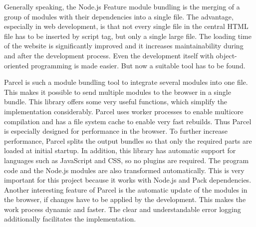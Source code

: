 Generally speaking, the Node.js Feature module bundling is the merging of a group of modules with their dependencies into a single file. The advantage, especially in web development, is that not every single file in the central HTML file has to be inserted by script tag, but only a single large file. The loading time of the website is significantly improved and it increases maintainability during and after the development process. Even the development itself with object-oriented programming is made easier. But now a suitable tool has to be found. \cite{Kasireddy2016}

Parcel is such a module bundling tool to integrate several modules into one file. This makes it possible to send multiple modules to the browser in a single bundle. This library offers some very useful functions, which simplify the implementation considerably. Parcel uses worker processes to enable multicore compilation and has a file system cache to enable very fast rebuilds. Thus Parcel is especially designed for performance in the browser. To further increase performance, Parcel splits the output bundles so that only the required parts are loaded at initial startup. In addition, this library has automatic support for languages such as JavaScript and CSS, so no plugins are required. The program code and the Node.js modules are also transformed automatically. This is very important for this project because it works with Node.js and Pack dependencies. Another interesting feature of Parcel is the automatic update of the modules in the browser, if changes have to be applied by the development. This makes the work process dynamic and faster. The clear and understandable error logging additionally facilitates the implementation. \cite{Govett2019}

